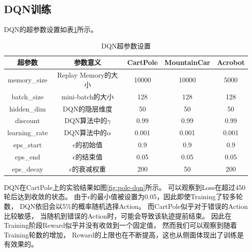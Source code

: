 \documentclass[a4paper,UTF8]{article}
\theoremstyle{definition}
\begin{document}
\subsection*{DQN训练}

DQN的超参数设置如表\ref{tab:arg-dqn}所示。

\begin{table}[H]
	\centering
	\caption{DQN超参数设置}\label{tab:arg-dqn}
	\begin{tabular}{ccccc}
		\toprule
		超参数 & 参数意义 & CartPole & MountainCar & Acrobot \\
		\midrule
		memory\_size & Replay Memory的大小 & 10000 & 10000 & 5000 \\
		batch\_size & mini-batch的大小 & 128 & 128 & 128 \\
		hidden\_dim & DQN的隐层维度 & 50 & 50 & 50\\
		discount & DQN算法中的$\gamma$ & 0.99 & 0.99 & 0.99 \\
		learning\_rate & DQN算法中的$\alpha$ & 0.001 & 0.001 & 0.001 \\
		eps\_start & $\epsilon$的初始值 & 0.9 & 0.9 & 0.9 \\
		eps\_end & $\epsilon$的结束值 & 0.05 & 0.05 & 0.05\\
		eps\_decay & $\epsilon$的衰减权重 & 200 & 50 & 200 \\
		\bottomrule
	\end{tabular}
\end{table}

DQN在CartPole上的实验结果如图\ref{fig:pole-dqn}所示。
可以观察到Loss在超过450轮后达到收敛的状态。
由于$\epsilon$的最小值被设置为0.05，因此即使Training了较多轮数，
DQN依旧会以5\%的概率随机选择Action。
而CartPole似乎对于错误的Action比较敏感，
当随机到错误的Action时，可能会导致该轨迹提前结束。
因此在Training阶段Reward似乎并没有收敛到一个固定值，
然而我们可以观察到随着Training轮数的增加，
Reward的上限也在不断提高，这也从侧面体现出了训练是有效果的。
\end{document}
